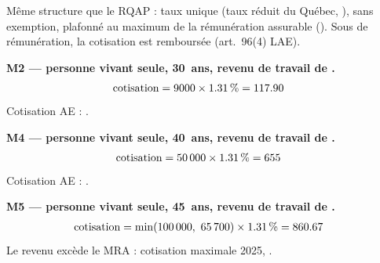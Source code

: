\pexemples Même structure que le RQAP : taux unique (taux réduit du Québec,
), sans exemption, plafonné au maximum de la rémunération
assurable (). Sous  de rémunération, la cotisation est
remboursée (art.~96(4) LAE).

\medskip\noindent\textbf{M2 --- personne vivant seule, 30~ans, revenu de travail de .}
\begin{align*}
\text{cotisation} &= \num{9000} \times \num{1.31}\,\% = \num{117.90}
\end{align*}
Cotisation AE : .

\medskip\noindent\textbf{M4 --- personne vivant seule, 40~ans, revenu de travail de .}
\begin{align*}
\text{cotisation} &= \num{50000} \times \num{1.31}\,\% = \num{655}
\end{align*}
Cotisation AE : .

\medskip\noindent\textbf{M5 --- personne vivant seule, 45~ans, revenu de travail de .}
\begin{align*}
\text{cotisation} &= \min(\num{100000},\ \num{65700}) \times \num{1.31}\,\% = \num{860.67}
\end{align*}
Le revenu excède le MRA : cotisation maximale 2025, .
